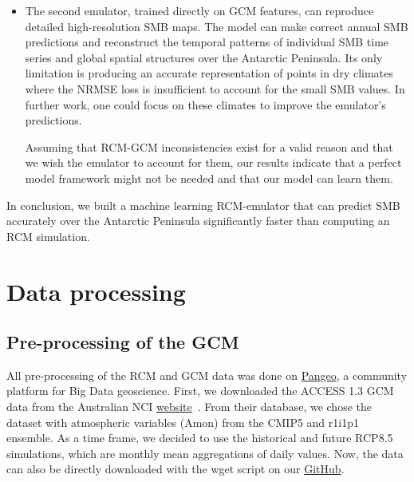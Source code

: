 \documentclass[a4paper,11pt,oneside]{report}
\begin{document}
\begin{itemize}
\begin{itemize}
        \item The second emulator, trained directly on GCM features, can reproduce detailed high-resolution SMB maps. The model can make correct annual SMB predictions and reconstruct the temporal patterns of individual SMB time series and global spatial structures over the Antarctic Peninsula. Its only limitation is producing an accurate representation of points in dry climates where the NRMSE loss is insufficient to account for the small SMB values. In further work, one could focus on these climates to improve the emulator's predictions. 
        
        Assuming that RCM-GCM inconsistencies exist for a valid reason and that we wish the emulator to account for them, our results indicate that a perfect model framework might not be needed and that our model can learn them.  
    \end{itemize}
\end{itemize}
In conclusion, we built a machine learning RCM-emulator that can predict SMB accurately over the Antarctic Peninsula significantly faster than computing an RCM simulation. 


\cleardoublepage
{}
{}
\printbibliography
\appendix

\chapter{Data processing}

\section{Pre-processing of the GCM}\label{sec:preproc-GCM}

All pre-processing of the RCM and GCM data was done on \href{https://pangeo.io/about.html}{Pangeo}, a community platform for Big Data geoscience. First, we downloaded the ACCESS 1.3 GCM data from the Australian NCI \href{https://esgf.nci.org.au/search/esgf-nci/}{website}~\cite{NCI}. From their database, we chose the dataset with atmospheric variables (Amon) from the CMIP5 and r1i1p1 ensemble. As a time frame, we decided to use the historical and future RCP8.5 simulations, which are monthly mean aggregations of daily values. Now, the data can also be directly downloaded with the wget script on our \href{https://github.com/marvande/master-thesis}{GitHub}. 
\end{document}

